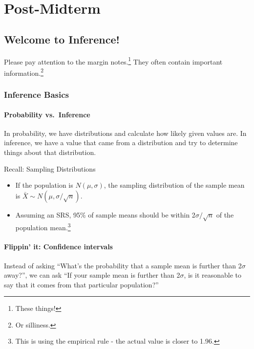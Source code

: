 \documentclass[
  letterpaper,
  DIV=11,
  numbers=noendperiod]{scrreprt}
\providecommand{\tightlist}{%
  \setlength{\itemsep}{0pt}\setlength{\parskip}{0pt}}\usepackage{longtable,booktabs,array}
\begin{document}
\part{Post-Midterm}

\hypertarget{welcome-to-inference}{%
\chapter{Welcome to Inference!}\label{welcome-to-inference}}

Please pay attention to the margin notes.\footnote{These things!} They
often contain important information.\footnote{Or silliness.}

\hypertarget{inference-basics}{%
\section{Inference Basics}\label{inference-basics}}

\hypertarget{probability-vs.-inference}{%
\subsection{Probability vs.~Inference}\label{probability-vs.-inference}}

In probability, we have distributions and calculate how likely given
values are. In inference, we have a value that came from a distribution
and try to determine things about that distribution.

Recall: Sampling Distributions

\begin{itemize}
\tightlist
\item
  If the population is \(N(\mu,\sigma)\), the sampling distribution of
  the sample mean is \(\bar X\sim N(\mu,\sigma/\sqrt{n})\).
\item
  Assuming an SRS, 95\% of sample means should be within
  2\(\sigma/\sqrt{n}\) of the population mean.\footnote{This is using
    the empirical rule - the actual value is closer to 1.96.}
\end{itemize}

\hypertarget{flippin-it-confidence-intervals}{%
\subsection{Flippin' it: Confidence
intervals}\label{flippin-it-confidence-intervals}}

Instead of asking ``What's the probability that a sample mean is further
than 2\(\sigma\) away?'', we can ask ``If your sample mean is further
than 2\(\sigma\), is it reasonable to say that it comes from that
particular population?''
\end{document}
